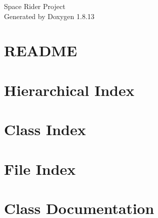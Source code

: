 \documentclass[twoside]{book}
\newcommand{\+}{\discretionary{\mbox{\scriptsize$\hookleftarrow$}}{}{}}
\newcommand{\clearemptydoublepage}{%
  \newpage{\pagestyle{empty}\cleardoublepage}%
}
\begin{document}
\hypersetup{pageanchor=false,
             bookmarksnumbered=true,
             pdfencoding=unicode
            }
\begin{titlepage}
\vspace*{7cm}
\begin{center}%
{\Large Space Rider Project }\\
\vspace*{1cm}
{\large Generated by Doxygen 1.8.13}\\
\end{center}
\end{titlepage}
\clearemptydoublepage
{}
\tableofcontents
\clearemptydoublepage
{}
\hypersetup{pageanchor=true}

\chapter{R\+E\+A\+D\+ME}
\label{md__c_1__users__user__documents__software_dev2_project__space_rider_project__r_e_a_d_m_e}

\chapter{Hierarchical Index}

\chapter{Class Index}

\chapter{File Index}

\chapter{Class Documentation}






























\end{document}
